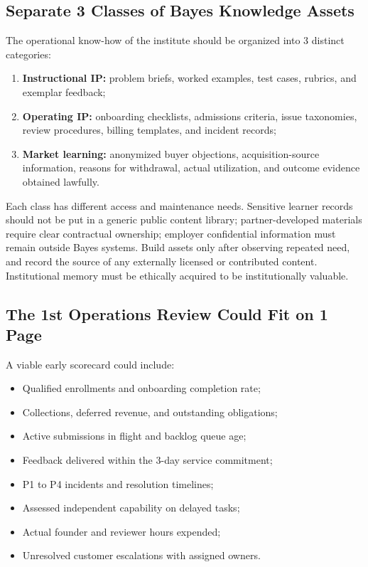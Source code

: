 \subsection{Separate 3 Classes of Bayes Knowledge Assets}
\label{sec:bayes_three_classes_assets}

The operational know-how of the institute should be organized into 3 distinct categories:
\begin{enumerate}
    \item \textbf{Instructional IP:} problem briefs, worked examples, test cases, rubrics, and exemplar feedback;
    \item \textbf{Operating IP:} onboarding checklists, admissions criteria, issue taxonomies, review procedures, billing templates, and incident records;
    \item \textbf{Market learning:} anonymized buyer objections, acquisition-source information, reasons for withdrawal, actual utilization, and outcome evidence obtained lawfully.
\end{enumerate}

Each class has different access and maintenance needs. Sensitive learner records should not be put in a generic public content library; partner-developed materials require clear contractual ownership; employer confidential information must remain outside Bayes systems. Build assets only after observing repeated need, and record the source of any externally licensed or contributed content. Institutional memory must be ethically acquired to be institutionally valuable.

\subsection{The 1st Operations Review Could Fit on 1 Page}
\label{sec:bayes_first_operations_review}

A viable early scorecard could include:
\begin{itemize}
    \item Qualified enrollments and onboarding completion rate;
    \item Collections, deferred revenue, and outstanding obligations;
    \item Active submissions in flight and backlog queue age;
    \item Feedback delivered within the 3-day service commitment;
    \item P1 to P4 incidents and resolution timelines;
    \item Assessed independent capability on delayed tasks;
    \item Actual founder and reviewer hours expended;
    \item Unresolved customer escalations with assigned owners.
\end{itemize}

